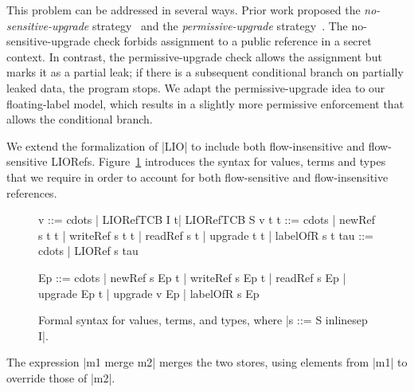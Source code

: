 This problem can be addressed in several ways. Prior work proposed the
\emph{no-sensitive-upgrade} strategy~\citep{?} and the
\emph{permissive-upgrade} strategy~\citep{?}. The no-sensitive-upgrade
check forbids assignment to a public reference in a secret context. In
contrast, the permissive-upgrade check allows the assignment but marks
it as a partial leak; if there is a subsequent conditional branch on
partially leaked data, the program stops. We adapt the
permissive-upgrade idea to our floating-label model, which results in
a slightly more permissive enforcement that allows the conditional
branch.

We extend the formalization of |LIO| to include both flow-insensitive
and flow-sensitive LIORefs. Figure~\ref{fig:fs-exts-syntax} introduces
the syntax for values, terms and types that we require in order to
account for both flow-sensitive and flow-insensitive references.

\begin{figure}[!ht] %
\centering
\begin{code}
v    ::= cdots  | LIORefTCB I t| LIORefTCB S v t
t    ::= cdots  | newRef s t t | writeRef s t t 
                | readRef s t | upgrade t t
                | labelOfR s t
tau  ::= cdots  | LIORef s tau


Ep   ::= cdots  | newRef s Ep t | writeRef s Ep t 
                | readRef s Ep | upgrade Ep t | upgrade v Ep
                | labelOfR s Ep
\end{code}
\caption{Formal syntax for values, terms, and types,
where |s  ::=  S inlinesep I|.\label{fig:fs-exts-syntax}}
\vspace*{-5pt}
\end{figure} 

The expression |m1 merge m2| merges the two stores, using elements
from |m1| to override those of |m2|.


